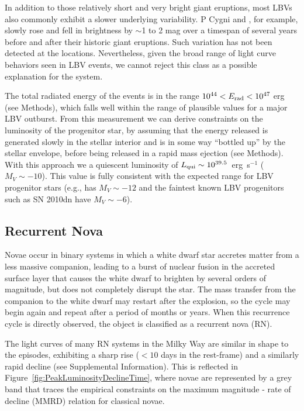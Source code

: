 In addition to those relatively short and very bright giant eruptions,
most LBVs also commonly exhibit a slower underlying variability. P
Cygni and \etaCar, for example, slowly rose and fell in brightness by
$\sim$1 to 2 mag over a timespan of several years before and after
their historic giant eruptions.  Such variation has not been detected
at the \spock locations. Nevertheless, given the broad
range of light curve behaviors seen in LBV events, we cannot reject
this class as a possible explanation for the \spock system.

The total radiated energy of the \spock events is in the range
$10^{44}<E_{\rm rad}<10^{47}$ erg (see Methods), which falls well
within the range of plausible values for a major LBV outburst.  From
this measurement we can derive constraints on the luminosity of the
progenitor star, by assuming that the energy released is generated
slowly in the stellar interior and is in some way ``bottled up'' by
the stellar envelope, before being released in a rapid mass ejection
(see Methods).  With this approach we a quiescent luminosity of
$L_{\rm qui}\sim10^{39.5}$~erg~s$^{-1}$ ($M_V\sim-10$).  This value is
fully consistent with the expected range for LBV progenitor stars
(e.g., \etacar has $M_V\sim-12$ and the faintest known LBV progenitors
such as SN 2010dn have $M_V\sim-6$).


\subsection{Recurrent Nova}\label{sec:RNe}

Novae occur in binary systems in which a white dwarf star accretes
matter from a less massive companion, leading to a burst of nuclear
fusion in the accreted surface layer that causes the white dwarf to
brighten by several orders of magnitude, but does not completely
disrupt the star. The mass transfer from the companion to the white
dwarf may restart after the explosion, so the cycle may begin again
and repeat after a period of months or years.  When this recurrence
cycle is directly observed, the object is classified as a recurrent
nova (RN).

The light curves of many RN systems in the Milky Way are similar in
shape to the \spock episodes, exhibiting a sharp rise ($<10$ days in
the rest-frame) and a similarly rapid decline (see Supplemental
Information).  This is reflected in
Figure~\ref{fig:PeakLuminosityDeclineTime}, where novae are
represented by a grey band that traces the empirical constraints on
the maximum magnitude - rate of decline (MMRD) relation for classical
novae\cite{DellaValle:1995, Downes:2000, Shafter:2011,
  Kasliwal:2011a}.

